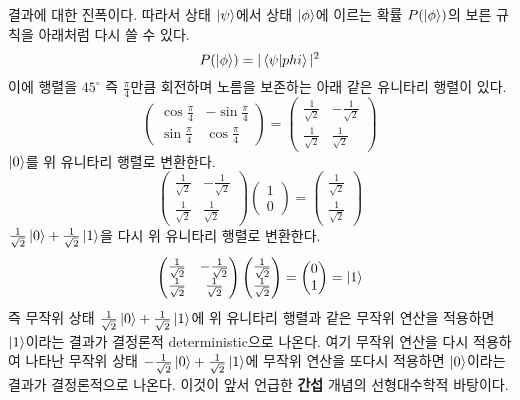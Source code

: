 \documentclass[a4paper,chapter,atbegshi]{oblivoir}
\begin{document}
결과에 대한 진폭이다. 따라서 상태 $\ket\psi$에서 상태 $\ket\phi$에 이르는
확률 $P(\ket\phi)$의 보른 규칙을 아래처럼 다시 쓸 수 있다.
\[
  P(\ket\phi)=|\braket{\psi|phi}|^2
\]
이에 행렬을 $45^{\circ}$ 즉 $\frac{\pi}{4}$만큼 회전하며 노름을 보존하는
아래 같은 유니타리 행렬이 있다.
\[
  \begin{pmatrix}
    \cos\frac{\pi}{4} &-\sin\frac{\pi}{4}\\
    \sin\frac{\pi}{4} &\cos\frac{\pi}{4}
  \end{pmatrix}
  = \begin{pmatrix}
    \frac{1}{\sqrt{2}} &-\frac{1}{\sqrt{2}} \\
    \frac{1}{\sqrt{2}} &\frac{1}{\sqrt2}
  \end{pmatrix}
\]
$\ket0$를 위 유니타리 행렬로 변환한다.
\begin{equation}\label{eq:1-2}
  \begin{pmatrix}
    \frac{1}{\sqrt{2}} &-\frac{1}{\sqrt{2}} \\
    \frac{1}{\sqrt{2}} &\frac{1}{\sqrt2}
  \end{pmatrix}
  \begin{pmatrix}
    1\\0
  \end{pmatrix}
  =\begin{pmatrix}
    \frac{1}{\sqrt2}\\\frac{1}{\sqrt2}
  \end{pmatrix}
\end{equation}
$\frac{1}{\sqrt2}\ket{0}+\frac{1}{\sqrt2}\ket{1}$을 다시 위 유니타리 행렬로
변환한다.
\[
  \begin{pmatrix}
    \frac{1}{\sqrt{2}} &-\frac{1}{\sqrt{2}} \\
    \frac{1}{\sqrt{2}} &\frac{1}{\sqrt2}
  \end{pmatrix}
  \begin{pmatrix}
    \frac{1}{\sqrt2}\\\frac{1}{\sqrt2}
  \end{pmatrix}
  =\begin{pmatrix}0\\1\end{pmatrix}=\ket{1}
\]
즉 무작위 상태 $\frac{1}{\sqrt2}\ket{0}+\frac{1}{\sqrt2}\ket{1}$에 위 유니타리
행렬과 같은 무작위 연산을 적용하면 $\ket{1}$이라는 결과가 결정론적{\tiny
deterministic}으로 나온다. 여기 무작위 연산을 다시 적용하여 나타난 무작위 상태
 $-\frac{1}{\sqrt2}\ket{0}+\frac{1}{\sqrt2}\ket{1}$에 무작위 연산을 또다시
 적용하면 $\ket{0}$이라는 결과가 결정론적으로 나온다. 이것이 앞서 언급한
 \textbf{간섭} 개념의 선형대수학적 바탕이다. 
\end{document}
